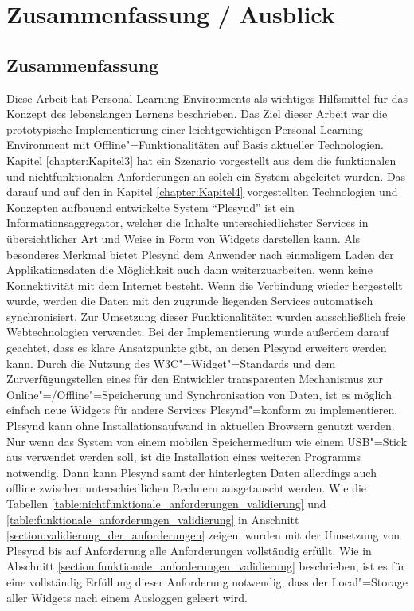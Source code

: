 \chapter{Zusammenfassung / Ausblick} 
\label{chapter:Kapitel7}

\section{Zusammenfassung}
Diese Arbeit hat Personal Learning Environments als wichtiges Hilfsmittel für das Konzept des lebenslangen Lernens beschrieben. Das Ziel dieser Arbeit war die prototypische Implementierung einer leichtgewichtigen Personal Learning Environment mit Offline"=Funktionalitäten auf Basis aktueller Technologien. Kapitel \ref{chapter:Kapitel3} hat ein Szenario vorgestellt aus dem die funktionalen und nichtfunktionalen Anforderungen an solch ein System abgeleitet wurden. Das darauf und auf den in Kapitel \ref{chapter:Kapitel4} vorgestellten Technologien und Konzepten aufbauend entwickelte System "`Plesynd"' ist ein Informationsaggregator, welcher die Inhalte unterschiedlichster Services in übersichtlicher Art und Weise in Form von Widgets darstellen kann. Als besonderes Merkmal bietet Plesynd dem Anwender nach einmaligem Laden der Applikationsdaten die Möglichkeit auch dann weiterzuarbeiten, wenn keine Konnektivität mit dem Internet besteht. Wenn die Verbindung wieder hergestellt wurde, werden die Daten mit den zugrunde liegenden Services automatisch synchronisiert. Zur Umsetzung dieser Funktionalitäten wurden ausschließlich freie Webtechnologien verwendet. Bei der Implementierung wurde außerdem darauf geachtet, dass es klare Ansatzpunkte gibt, an denen Plesynd erweitert werden kann. Durch die Nutzung des W3C"=Widget"=Standards und dem Zurverfügungstellen eines für den Entwickler transparenten Mechanismus zur Online"=/Offline"=Speicherung und Synchronisation von Daten, ist es möglich einfach neue Widgets für andere Services Plesynd"=konform zu implementieren. Plesynd kann ohne Installationsaufwand in aktuellen Browsern genutzt werden. Nur wenn das System von einem mobilen Speichermedium wie einem USB"=Stick aus verwendet werden soll, ist die Installation eines weiteren Programms notwendig. Dann kann Plesynd samt der hinterlegten Daten allerdings auch offline zwischen unterschiedlichen Rechnern ausgetauscht werden.  Wie die Tabellen \ref{table:nichtfunktionale_anforderungen_validierung} und \ref{table:funktionale_anforderungen_validierung} in Anschnitt \ref{section:validierung_der_anforderungen} zeigen, wurden mit der Umsetzung von Plesynd bis auf Anforderung  alle Anforderungen vollständig erfüllt. Wie in Abschnitt \ref{section:funktionale_anforderungen_validierung} beschrieben, ist es für eine vollständig Erfüllung dieser Anforderung notwendig, dass der Local"=Storage aller Widgets nach einem Ausloggen geleert wird. 

